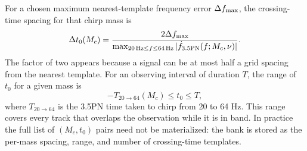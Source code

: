 \documentclass[aps,prd,amsmath,floats,floatfix, twocolumn,
superscriptaddress,nofootinbib,showpacs]{revtex4-2}
\begin{document}
For a chosen maximum nearest-template frequency error $\Delta f_{\rm max}$,
the crossing-time spacing for that chirp mass is
\begin{equation}
\Delta t_0(M_c)
=
\frac{2\Delta f_{\rm max}}
{\max_{20\,{\rm Hz}\le f\le64\,{\rm Hz}}
|\dot f_{\rm 3.5PN}(f;M_c,\nu)|}.
\label{eq:t0_grid_condition}
\end{equation}
The factor of two appears because a signal can be at most half a grid spacing
from the nearest template.  For an observing interval of duration $T$, the
range of $t_0$ for a given mass is
\begin{equation}
-T_{20\rightarrow64}(M_c) \le t_0 \le T,
\end{equation}
where $T_{20\rightarrow64}$ is the 3.5PN time taken to chirp from 20 to
64 Hz.  This range covers every track that overlaps the observation while it
is in band.  In practice the full list of $(M_c,t_0)$ pairs need not be
materialized: the bank is stored as the per-mass spacing, range, and number of
crossing-time templates.
\end{document}
